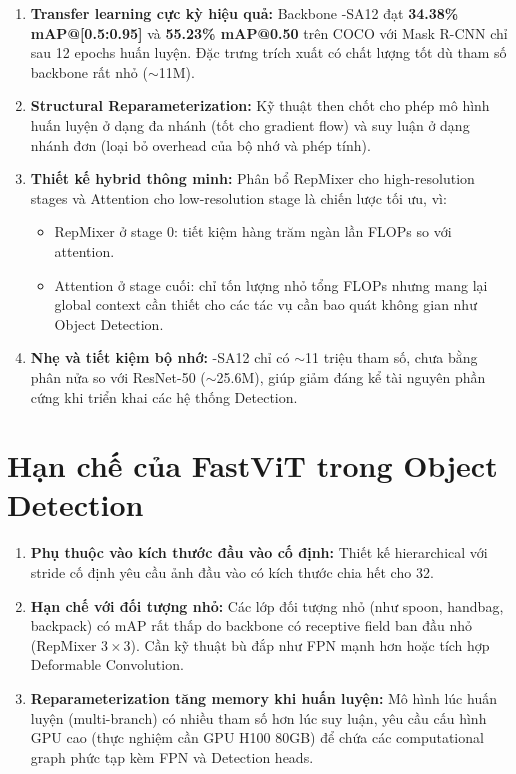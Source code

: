 \begin{enumerate}
    \item \textbf{Transfer learning cực kỳ hiệu quả:} Backbone \fastvit{}-SA12 đạt \textbf{34.38\% mAP@[0.5:0.95]} và \textbf{55.23\% mAP@0.50} trên COCO với Mask R-CNN chỉ sau 12 epochs huấn luyện. Đặc trưng trích xuất có chất lượng tốt dù tham số backbone rất nhỏ ($\sim$11M).
    
    \item \textbf{Structural Reparameterization:} Kỹ thuật then chốt cho phép mô hình huấn luyện ở dạng đa nhánh (tốt cho gradient flow) và suy luận ở dạng nhánh đơn (loại bỏ overhead của bộ nhớ và phép tính).
    
    \item \textbf{Thiết kế hybrid thông minh:} Phân bổ RepMixer cho high-resolution stages và Attention cho low-resolution stage là chiến lược tối ưu, vì:
    \begin{itemize}
        \item RepMixer ở stage 0: tiết kiệm hàng trăm ngàn lần FLOPs so với attention.
        \item Attention ở stage cuối: chỉ tốn lượng nhỏ tổng FLOPs nhưng mang lại global context cần thiết cho các tác vụ cần bao quát không gian như Object Detection.
    \end{itemize}
    
    \item \textbf{Nhẹ và tiết kiệm bộ nhớ:} \fastvit{}-SA12 chỉ có $\sim$11 triệu tham số, chưa bằng phân nửa so với ResNet-50 ($\sim$25.6M), giúp giảm đáng kể tài nguyên phần cứng khi triển khai các hệ thống Detection.
\end{enumerate}

\section{Hạn chế của FastViT trong Object Detection}
\label{sec:limitations}

\begin{enumerate}
    \item \textbf{Phụ thuộc vào kích thước đầu vào cố định:} Thiết kế hierarchical với stride cố định yêu cầu ảnh đầu vào có kích thước chia hết cho 32.
    
    \item \textbf{Hạn chế với đối tượng nhỏ:} Các lớp đối tượng nhỏ (như spoon, handbag, backpack) có mAP rất thấp do backbone có receptive field ban đầu nhỏ (RepMixer $3 \times 3$). Cần kỹ thuật bù đắp như FPN mạnh hơn hoặc tích hợp Deformable Convolution.
    
    \item \textbf{Reparameterization tăng memory khi huấn luyện:} Mô hình lúc huấn luyện (multi-branch) có nhiều tham số hơn lúc suy luận, yêu cầu cấu hình GPU cao (thực nghiệm cần GPU H100 80GB) để chứa các computational graph phức tạp kèm FPN và Detection heads.
\end{enumerate}

